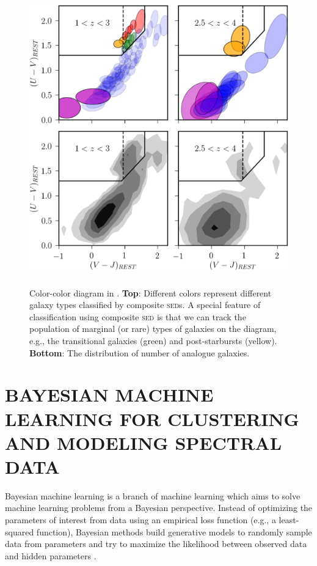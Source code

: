 \documentclass{ar-1col}
\begin{document}
\begin{figure}
    \includegraphics[width=5in, height=5in]{images/color-color.png}
    \caption{Color-color diagram in \citet{Forrest2018}. \textbf{Top}: Different colors represent different galaxy types classified by composite \textsc{sed}s. A special feature of classification using composite \textsc{sed} is that we can track the population of marginal (or rare) types of galaxies on the diagram, e.g., the transitional galaxies (green) and post-starbursts (yellow). \textbf{Bottom}: The distribution of number of analogue galaxies.}
    \label{fig:color-color}
\end{figure}

\section{BAYESIAN MACHINE LEARNING FOR CLUSTERING AND MODELING SPECTRAL DATA}

Bayesian machine learning is a branch of machine learning which aims to solve machine learning problems from a Bayesian perspective. 
Instead of optimizing the parameters of interest from data using an empirical loss function (e.g., a least-squared function), Bayesian methods build generative models to randomly sample data from parameters and try to maximize the likelihood between observed data and hidden parameters \citep{Barber2012}.
\end{document}
